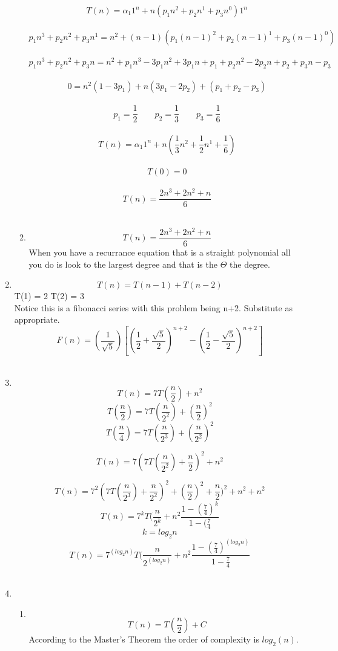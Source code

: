 \documentclass[12pt]{amsart}
\newcommand{\fr}[2]{\frac{#1}{#2}}
\begin{document}
\begin{enumerate}
\begin{enumerate}
$$T(n) = \alpha_1{1^n} + n(p_1n^2 + p_2n^1 + p_3n^0)1^n$$\\
$$p_1n^3 + p_2n^2 + p_3n^1 = n^2 + (n-1)(p_1(n-1)^2 + p_2(n-1)^1 +
p_3(n-1)^0)$$\\
$$p_1n^3 + p_2n^2 + p_3n = n^2 + p_1n^3 - 3p_1n^2 + 3p_1n + p_1 + p_2n^2 - 2p_2n + p_2  + p_3n -
p_3$$\\
$$0 = n^2(1  - 3p_1) + n(3p_1 - 2p_2) + (p_1 + p_2  - p_3)$$\\
$$p_1 = \fr{1}{2}   \qquad p_2 = \fr{1}{3}   \qquad p_3 = \fr{1}{6}
$$\\
$$T(n) = \alpha_1{1^n} + n(\fr{1}{3}n^2 + \fr{1}{2}n^1 +
\fr{1}{6})$$\\
$$T(0) = 0$$\\
$$T(n) = \fr{2n^3 + 2n^2 + n}{6}$$\\

\item

$$T(n) = \fr{2n^3 + 2n^2 + n}{6}$$
        When you have a recurrance equation that is a straight polynomial all you do is look to the largest degree and that is the $\Theta$ the
    degree.\\
\end{enumerate}
\item

$$T(n) = T(n-1) + T(n-2)$$\qquad T(1) = 2 \qquad T(2) = 3 \\
Notice this is a fibonacci series with this problem being n+2.
Substitute as appropriate.
$$ F(n) = (\fr{1}{\sqrt {5}})[(\fr{1}{2} + \fr{\sqrt{5}}{2})^{n+2} - (\fr{1}{2} -
        \fr{\sqrt{5}}{2})^{n+2}]$$\\

\item
$$$$
$$T(n)=7T(\fr{n}{2}) + n^2$$
$$T(\fr{n}{2})=7T(\fr{n}{2^2}) + (\fr{n}{2})^2$$
$$T(\fr{n}{4})=7T(\fr{n}{2^3}) + (\fr{n}{2^2})^2$$


$$T(n)=7(7T(\fr{n}{2^2}) + \fr{n}{2})^2 + n^2$$

$$T(n)=7^2(7T(\fr{n}{2^3}) + \fr{n}{2^2})^2 + (\fr{n}{2})^2 + \fr{n}{2})^2 + n^2 + n^2$$
$$T(n)=7^kT(\fr{n}{2^k} + n^2\fr{1-(\fr{7}{4})^k}{1-(\fr{7}{4}}$$
$$k = log_2n$$
$$T(n)=7^(log_2n)T(\fr{n}{2^(log_2n)} +
n^2\fr{1-(\fr{7}{4})^(log_2n)}{1-\fr{7}{4}}$$\\
\item
\begin{enumerate}
\item
$$$$
$$T(n)=T(\fr{n}{2}) + C$$
    According to the Master's Theorem the order of complexity is
    $log_2(n)$.\\


\end{enumerate}
\end{enumerate}
\end{document}
